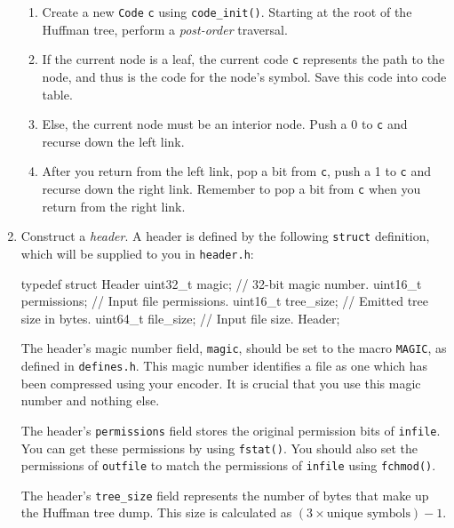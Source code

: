 \documentclass[11pt]{article}
\begin{document}
\begin{enumerate}
    \begin{enumerate}
    \item Create a new \texttt{Code} \texttt{c} using \texttt{code\_init()}.
        Starting at the root of the Huffman tree, perform a
        \emph{post-order} traversal.
      \item If the current node is a leaf, the current code \texttt{c}
        represents the path to the node, and thus is the code for the
        node's symbol. Save this code into code table.
      \item Else, the current node must be an interior node. Push a 0 to
        \texttt{c} and recurse down the left link.
      \item After you return from the left link, pop a bit from
        \texttt{c}, push a 1 to \texttt{c} and recurse down the right
        link. Remember to pop a bit from \texttt{c} when you return from
        the right link.
      \end{enumerate}

  \item Construct a \emph{header}. A header is defined by the following
    \texttt{struct} definition, which will be supplied to you in
    \texttt{header.h}:
    \vspace{-10pt}
    \begin{codelisting}{}
typedef struct Header {
    uint32_t magic;       // 32-bit magic number.
    uint16_t permissions; // Input file permissions.
    uint16_t tree_size;   // Emitted tree size in bytes.
    uint64_t file_size;   // Input file size.
} Header;
    \end{codelisting}

    The header's magic number field, \texttt{magic}, should be set to
    the macro \texttt{MAGIC}, as defined in \texttt{defines.h}. This
    magic number identifies a file as one which has been compressed
    using your encoder. It is crucial that you use this magic number and
    nothing else.

    The header's \texttt{permissions} field stores the original
    permission bits of \texttt{infile}. You can get these permissions by
    using \texttt{fstat()}. You should also set the permissions of
    \texttt{outfile} to match the permissions of \texttt{infile} using
    \texttt{fchmod()}.

    The header's \texttt{tree\_size} field represents the number of
    bytes that make up the Huffman tree dump. This size is calculated as
    $(3 \times \text{unique symbols}) - 1$.


\end{enumerate}
\end{document}
